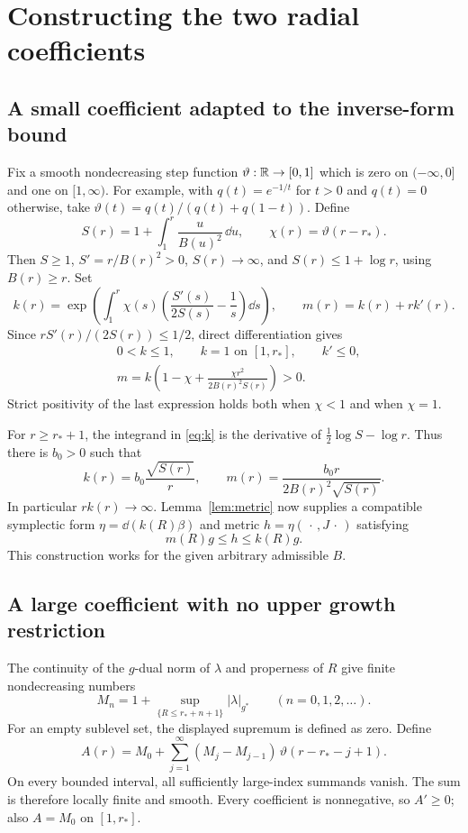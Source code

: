 \section{Constructing the two radial coefficients}
\subsection{A small coefficient adapted to the inverse-form bound}
Fix a smooth nondecreasing step function $\vartheta:\mathbb R\to[0,1]$
which is zero on $(-\infty,0]$ and one on $[1,\infty)$.
For example, with $q(t)=e^{-1/t}$ for $t>0$ and $q(t)=0$
otherwise, take $\vartheta(t)=q(t)/(q(t)+q(1-t))$.
Define
\[
 S(r)=1+\int_1^r\frac{u}{B(u)^2}\,\dd u,\qquad
 \chi(r)=\vartheta(r-r_*).
\]
Then $S\ge1$, $S'=r/B(r)^2>0$, $S(r)\to\infty$, and
$S(r)\le1+\log r$, using $B(r)\ge r$.
Set
\begin{equation}\label{eq:k}
 k(r)=\exp\left(\int_1^r
   \chi(s)\left(\frac{S'(s)}{2S(s)}-\frac1s\right)\dd s\right),
 \qquad m(r)=k(r)+rk'(r).
\end{equation}
Since $rS'(r)/(2S(r))\le1/2$, direct differentiation gives
\begin{align}
 &0<k\le1,\qquad k=1\text{ on }[1,r_*],\qquad k'\le0,\nonumber\\
 &m=k\left(1-\chi+\frac{\chi r^2}{2B(r)^2S(r)}\right)>0 .
 \label{eq:kproperties}
\end{align}
Strict positivity of the last expression holds both when $\chi<1$
and when $\chi=1$.

For $r\ge r_*+1$, the integrand in \eqref{eq:k} is
the derivative of $\frac12\log S-\log r$.
Thus there is $b_0>0$ such that
\begin{equation}\label{eq:ktail}
 k(r)=b_0\frac{\sqrt{S(r)}}r,\qquad
 m(r)=\frac{b_0r}{2B(r)^2\sqrt{S(r)}} .
\end{equation}
In particular $rk(r)\to\infty$.
Lemma~\ref{lem:metric} now supplies a compatible symplectic form
$\eta=\dd(k(R)\beta)$ and metric $h=\eta(\,\cdot\,,J\,\cdot\,)$
satisfying
\begin{equation}\label{eq:smallmetric}
 m(R)g\le h\le k(R)g.
\end{equation}
This construction works for the given arbitrary admissible $B$.

\subsection{A large coefficient with no upper growth restriction}
The continuity of the $g$-dual norm of $\lambda$ and properness of
$R$ give finite nondecreasing numbers
\[
 M_n=1+\sup_{\{R\le r_*+n+1\}}|\lambda|_{g^*}
 \qquad(n=0,1,2,\ldots).
\]
For an empty sublevel set, the displayed supremum is defined as
zero. Define
\begin{equation}\label{eq:A}
 A(r)=M_0+\sum_{j=1}^\infty
   (M_j-M_{j-1})\,\vartheta(r-r_*-j+1).
\end{equation}
On every bounded interval, all sufficiently large-index summands
vanish. The sum is therefore locally finite and smooth.
Every coefficient is nonnegative, so $A'\ge0$;
also $A=M_0$ on $[1,r_*]$.

